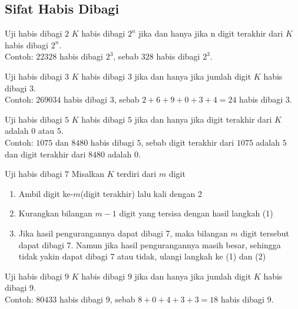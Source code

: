 \documentclass[aspectratio=169]{beamer}
\theoremstyle{definition}
\begin{document}
\subsection{Sifat Habis Dibagi}
\begin{frame}{\insertsection}{\insertsubsection}
  \begin{block}{Uji habis dibagi $2$}
    $K$ habis dibagi $2^n$ jika dan hanya jika n digit terakhir dari $K$ habis dibagi $2^n$.\\
    Contoh: $22328$ habis dibagi $2^3$, sebab $328$ habis dibagi $2^3.$
  \end{block}
  \begin{block}{Uji habis dibagi $3$}
    $K$ habis dibagi $3$ jika dan hanya jika jumlah digit $K$ habis dibagi $3$.\\
    Contoh: $269034$ habis dibagi $3$, sebab $2+6+9+0+3+4=24$ habis dibagi $3$.
  \end{block}
  \begin{block}{Uji habis dibagi $5$}
    $K$ habis dibagi $5$ jika dan hanya jika digit terakhir dari $K$ adalah $0$ atau $5$.\\
    Contoh: $1075$ dan $8480$ habis dibagi $5$, sebab digit terakhir dari $1075$ adalah $5$ dan digit terakhir dari $8480$ adalah $0$.
  \end{block}
\end{frame}
\begin{frame}{\insertsection}{\insertsubsection}
  \begin{block}{Uji habis dibagi $7$}
    Misalkan $K$ terdiri dari $m$ digit
    \begin{enumerate}
      \item Ambil digit ke-$m$(digit terakhir) lalu kali dengan 2
      \item Kurangkan bilangan $m-1$ digit yang tersisa dengan hasil langkah (1)
      \item Jika hasil pengurangannya dapat dibagi 7, maka bilangan $m$ digit tersebut dapat dibagi 7. Namun jika hasil pengurangannya masih besar, sehingga tidak yakin dapat dibagi 7 atau tidak, ulangi langkah ke (1) dan (2)
    \end{enumerate}
  \end{block}
  \begin{block}{Uji habis dibagi $9$}
    $K$ habis dibagi $9$ jika dan hanya jika jumlah digit $K$ habis dibagi $9$.\\
    Contoh: $80433$ habis dibagi $9$, sebab $8+0+4+3+3=18$ habis dibagi $9$.
  \end{block}
\end{frame}
\end{document}
